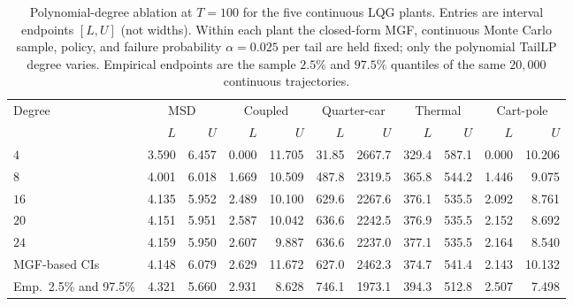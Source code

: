 \begin{table}[t]
\centering
\caption{Polynomial-degree ablation at $T=100$ for the five continuous LQG plants. Entries are interval endpoints $[L,U]$ (not widths). Within each plant the closed-form MGF, continuous Monte Carlo sample, policy, and failure probability $\alpha=0.025$ per tail are held fixed; only the polynomial TailLP degree varies. Empirical endpoints are the sample $2.5\%$ and $97.5\%$ quantiles of the same $20{,}000$ continuous trajectories.}
\label{tab:poly_degree_ablation_lqg}
\small
\setlength{\tabcolsep}{3.8pt}
\begin{tabular}{lrrrrrrrrrr}
\toprule
Degree & \multicolumn{2}{c}{MSD} & \multicolumn{2}{c}{Coupled} & \multicolumn{2}{c}{Quarter-car} & \multicolumn{2}{c}{Thermal} & \multicolumn{2}{c}{Cart-pole} \\
\cmidrule(lr){2-3} \cmidrule(lr){4-5} \cmidrule(lr){6-7} \cmidrule(lr){8-9} \cmidrule(lr){10-11}
 & $L$ & $U$ & $L$ & $U$ & $L$ & $U$ & $L$ & $U$ & $L$ & $U$ \\
\midrule
$4$ & 3.590 & 6.457 & 0.000 & 11.705 & 31.85 & 2667.7 & 329.4 & 587.1 & 0.000 & 10.206 \\
$8$ & 4.001 & 6.018 & 1.669 & 10.509 & 487.8 & 2319.5 & 365.8 & 544.2 & 1.446 & 9.075 \\
$16$ & 4.135 & 5.952 & 2.489 & 10.100 & 629.6 & 2267.6 & 376.1 & 535.5 & 2.092 & 8.761 \\
$20$ & 4.151 & 5.951 & 2.587 & 10.042 & 636.6 & 2242.5 & 376.9 & 535.5 & 2.152 & 8.692 \\
$24$ & 4.159 & 5.950 & 2.607 & 9.887 & 636.6 & 2237.0 & 377.1 & 535.5 & 2.164 & 8.540 \\
\midrule
MGF-based CIs & 4.148 & 6.079 & 2.629 & 11.672 & 627.0 & 2462.3 & 374.7 & 541.4 & 2.143 & 10.132 \\
Emp.\ 2.5\% and 97.5\% & 4.321 & 5.660 & 2.931 & 8.628 & 746.1 & 1973.1 & 394.3 & 512.8 & 2.507 & 7.498 \\
\bottomrule
\end{tabular}
\end{table}

